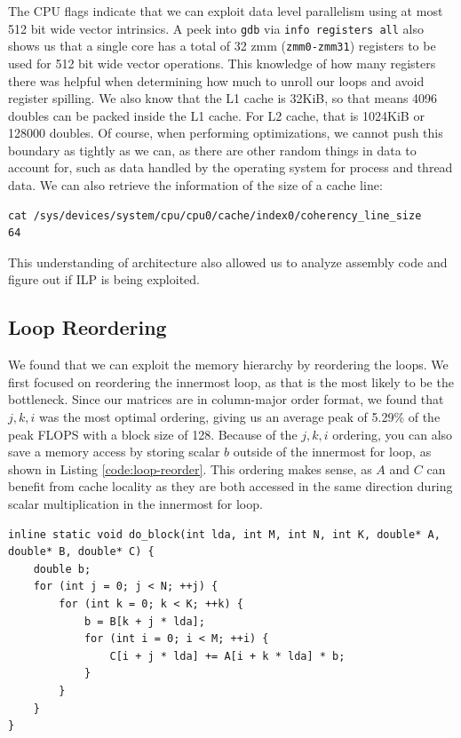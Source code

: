 \documentclass{article}
\begin{document}
The CPU flags indicate that we can exploit data level parallelism using at most 512 bit wide vector intrinsics. A peek into \verb|gdb| via \verb|info registers all| also shows us that a single core has a total of 32 zmm (\verb|zmm0-zmm31|) registers to be used for 512 bit wide vector operations. This knowledge of how many registers there was helpful when determining how much to unroll our loops and avoid register spilling. We also know that the L1 cache is 32KiB, so that means 4096 doubles can be packed inside the L1 cache. For L2 cache, that is 1024KiB or 128000 doubles. Of course, when performing optimizations, we cannot push this boundary as tightly as we can, as there are other random things in data to account for, such as data handled by the operating system for process and thread data. We can also retrieve the information of the size of a cache line:

\begin{verbatim}
cat /sys/devices/system/cpu/cpu0/cache/index0/coherency_line_size 
64
\end{verbatim}

This understanding of architecture also allowed us to analyze assembly code and figure out if ILP is being exploited.

\subsection{Loop Reordering}
We found that we can exploit the memory hierarchy by reordering the loops. We first focused on reordering the innermost loop, as that is the most likely to be the bottleneck. Since our matrices are in column-major order format, we found that $j, k, i$ was the most optimal ordering, giving us an average peak of 5.29\% of the peak FLOPS with a block size of 128. Because of the $j, k, i$ ordering, you can also save a memory access by storing scalar $b$ outside of the innermost for loop, as shown in Listing \ref{code:loop-reorder}. This ordering makes sense, as $A$ and $C$ can benefit from cache locality as they are both accessed in the same direction during scalar multiplication in the innermost for loop.

\label{code:loop-reorder}
\begin{verbatim}
inline static void do_block(int lda, int M, int N, int K, double* A, double* B, double* C) {
    double b;
    for (int j = 0; j < N; ++j) {
        for (int k = 0; k < K; ++k) {
            b = B[k + j * lda];
            for (int i = 0; i < M; ++i) {
                C[i + j * lda] += A[i + k * lda] * b;
            }
        }
    }
}
\end{verbatim}
\end{document}
